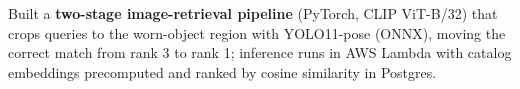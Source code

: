 \documentclass[letterpaper,10pt]{article}
\newcommand{\nk}{\kern0pt}
\newcommand{\resumeItem}[1]{
  \item\small{
    {#1 \vspace{-3pt}}
  }
}
\begin{document}
        \resumeItem{Built a \textbf{two-stage image-retrieval pipeline} (PyTorch, CLIP ViT-B/32) that crops queries to the worn-object region with YOLO11-pose (ONNX), moving the correct match from rank 3 to rank 1; inference runs in A\nk WS Lambda with catalog embeddings precomputed and ranked by cosine similarity in Postgres.}
\end{document}
